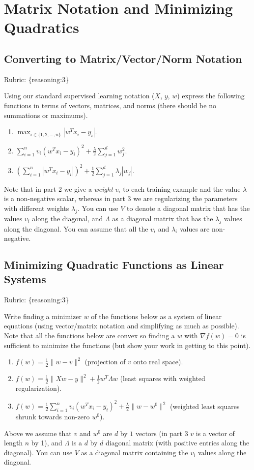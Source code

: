 \documentclass{article}
\def\rubric#1{\gre{Rubric: \{#1\}}}{}
\def\blu#1{{\color{blu}#1}}
\def\gre#1{{\color{gre}#1}}
\def\red#1{{\color{red}#1}}
\def\norm#1{\|#1\|}
\def\half{\frac 1 2}
\def\enum#1{\begin{enumerate}#1\end{enumerate}}
\begin{document}
\section{Matrix Notation and Minimizing Quadratics}


\subsection{Converting to Matrix/Vector/Norm Notation}
\rubric{reasoning:3}

Using our standard supervised learning notation ($X$, $y$, $w$)
express the following functions in terms of vectors, matrices, and norms (there should be no summations or maximums).
\blu{\enum{
\item $\max_{i \in \{1,2,\dots,n\}}  |w^Tx_i - y_i|$.
\item $\sum_{i=1}^n v_i(w^Tx_i  - y_i)^2 + \frac{\lambda}{2}\sum_{j=1}^d w_j^2$.
\item $\left(\sum_{i=1}^n |w^Tx_i - y_i|\right)^2 +  \half\sum_{j=1}^{d} \lambda_j|w_j|$.
}}
Note that in part 2 we give a \emph{weight} $v_i$ to each training example \red{and the value $\lambda$ is a non-negative scalar}, whereas in part 3 we are regularizing the parameters with different weights $\lambda_j$.
You can use $V$ to denote a diagonal matrix that has the values $v_i$ along the diagonal, and $\Lambda$ as a diagonal matrix that has the $\lambda_j$ values along the diagonal. You can assume that all the $v_i$ and $\lambda_i$ values are non-negative. 

\subsection{Minimizing Quadratic Functions as Linear Systems}
\rubric{reasoning:3}

Write finding a minimizer $w$ of the functions below as a system of linear equations (using vector/matrix notation and simplifying as much as possible). Note that all the functions below are convex  so finding a $w$ with $\nabla f(w) = 0$ is sufficient to minimize the functions (but show your work in getting to this point).

\blu{\enum{
\item $f(w) = \frac{1}{2}\norm{w-v}^2$ (projection of $v$ onto real space).
\item $f(w)= \frac{1}{2}\norm{Xw - y}^2 + \frac{1}{2}w^T\Lambda w$ (least squares with weighted regularization).
\item $f(w) = \frac{1}{2}\sum_{i=1}^n v_i (w^Tx_i - y_i)^2 + \frac{\lambda}{2}\norm{w-w^0}^2$ (weighted least squares shrunk towards non-zero $w^0$).
}}
Above we assume that $v$ and $w^0$ are $d$ by $1$ vectors (in part 3 $v$ is a vector of length $n$ by 1), and $\Lambda$ is a $d$ by $d$ diagonal matrix (with positive entries along the diagonal). You can use $V$ as a diagonal matrix containing the $v_i$ values along the diagonal.
\end{document}
